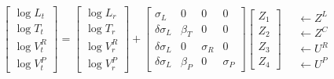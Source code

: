 \documentclass{article}
\begin{document}
\begin{align}
\begin{bmatrix}
    \log L_t \\ \log T_t \\ \log V^R_t \\ \log V^P_t 
\end{bmatrix}
=
\begin{bmatrix}
    \log L_r \\ \log T_r \\ \log V^R_r \\ \log V^P_r 
\end{bmatrix}
+
\begin{bmatrix}
    \sigma_L &  0  & 0  & 0  \\
    \delta \sigma_L  &  \beta_T  & 0  &   0 \\
    \delta \sigma_L  &  0        & \sigma_R  &   0 \\
    \delta \sigma_L  &  \beta_P  & 0  &   \sigma_P 
\end{bmatrix}
\begin{bmatrix}
    Z_1 \\ Z_2 \\ Z_3 \\ Z_4
\end{bmatrix}
\quad \begin{matrix}
    \leftarrow Z^L \\
    \leftarrow Z^C \\
    \leftarrow U^R \\
    \leftarrow U^P 
\end{matrix}
\end{align}
\end{document}
